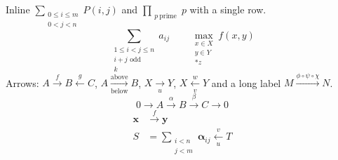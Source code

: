 \documentclass{article}
\begin{document}
Inline $\sum_{\substack{0 \le i \le m \\ 0 < j < n}} P(i,j)$ and
$\prod_{\substack{p\ \text{prime}}} p$ with a single row.
\[
  \sum_{\substack{1 \le i < j \le n\\ i + j \text{ odd} \\ k}} a_{ij}
  \qquad \max_{\substack{x \in X\\[2pt]y\in Y\\*z}} f(x,y)
\]
Arrows: $A \xrightarrow{f} B \xleftarrow{g} C$, $A \xrightarrow[\text{below}]{\text{above}} B$,
$X \xrightarrow[u]{} Y$, $X \xleftarrow[{v}]{w} Y$ and a long label
$M \xrightarrow{\phi \circ \psi \circ \chi} N$.
\begin{equation}
  0 \xrightarrow{} A \xrightarrow{\alpha} B \xrightarrow{\beta} C \xrightarrow{} 0
\end{equation}
\begin{align}
  \boldsymbol{x} &\xrightarrow{f} \boldsymbol{y} \\
  S &= \sum_{\substack{i < n\\ j < m}} \boldsymbol{\alpha}_{ij} \xleftarrow[u]{v} T
\end{align}
\end{document}
